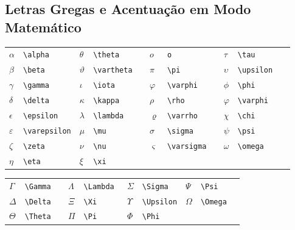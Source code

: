 \documentclass[fleqn]{icat-ufal}
\begin{document}
\begin{spacing}{1}

\section{Letras Gregas e Acentuação em Modo Matemático}

\begin{longtable}{p{4mm}p{25mm}p{4mm}p{25mm}p{4mm}p{25mm}p{4mm}p{25mm}} \hline
  $\alpha     $ & \lstinline!\alpha     ! & 
  $\theta     $ & \lstinline!\theta     ! & 
  $o          $ & \lstinline!o          ! & 
  $\tau       $ & \lstinline!\tau       ! \\
  $\beta      $ & \lstinline!\beta      ! & 
  $\vartheta  $ & \lstinline!\vartheta  ! & 
  $\pi        $ & \lstinline!\pi        ! & 
  $\upsilon   $ & \lstinline!\upsilon   ! \\
  $\gamma     $ & \lstinline!\gamma     ! & 
  $\iota      $ & \lstinline!\iota      ! & 
  $\varphi    $ & \lstinline!\varphi    ! & 
  $\phi       $ & \lstinline!\phi       ! \\
  $\delta     $ & \lstinline!\delta     ! & 
  $\kappa     $ & \lstinline!\kappa     ! & 
  $\rho       $ & \lstinline!\rho       ! & 
  $\varphi    $ & \lstinline!\varphi    ! \\
  $\epsilon   $ & \lstinline!\epsilon   ! & 
  $\lambda    $ & \lstinline!\lambda    ! & 
  $\varrho    $ & \lstinline!\varrho    ! & 
  $\chi       $ & \lstinline!\chi       ! \\
  $\varepsilon$ & \lstinline!\varepsilon! & 
  $\mu        $ & \lstinline!\mu        ! & 
  $\sigma     $ & \lstinline!\sigma     ! & 
  $\psi       $ & \lstinline!\psi       ! \\
  $\zeta      $ & \lstinline!\zeta      ! & 
  $\nu        $ & \lstinline!\nu        ! & 
  $\varsigma  $ & \lstinline!\varsigma  ! & 
  $\omega     $ & \lstinline!\omega     ! \\
  $\eta       $ & \lstinline!\eta       ! & 
  $\xi        $ & \lstinline!\xi        ! \\ \hline
\end{longtable}

\begin{longtable}{p{4mm}p{25mm}p{4mm}p{25mm}p{4mm}p{25mm}p{4mm}p{25mm}} \hline
  $\Gamma  $ & \lstinline!\Gamma  ! &
  $\Lambda $ & \lstinline!\Lambda ! &
  $\Sigma  $ & \lstinline!\Sigma  ! &
  $\Psi    $ & \lstinline!\Psi    ! \\
  $\Delta  $ & \lstinline!\Delta  ! &
  $\Xi     $ & \lstinline!\Xi     ! &
  $\Upsilon$ & \lstinline!\Upsilon! &
  $\Omega  $ & \lstinline!\Omega  ! \\
  $\Theta  $ & \lstinline!\Theta  ! &
  $\Pi     $ & \lstinline!\Pi     ! &
  $\Phi    $ & \lstinline!\Phi    ! \\ \hline
\end{longtable}


\end{spacing}
\end{document}
